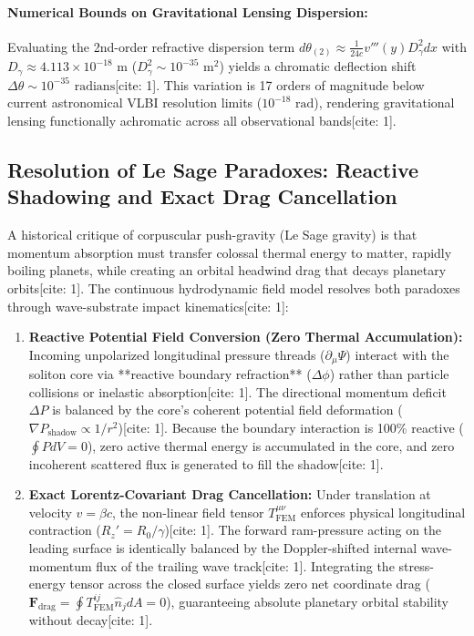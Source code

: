\documentclass[11pt,a4paper]{article}
\begin{document}
	\paragraph{Numerical Bounds on Gravitational Lensing Dispersion:}
	Evaluating the 2nd-order refractive dispersion term $d\theta_{(2)} \approx \frac{1}{24c} v'''(y) D_\gamma^2 dx$ with $D_\gamma \approx 4.113 \times 10^{-18}\text{ m}$ ($D_\gamma^2 \sim 10^{-35}\text{ m}^2$) yields a chromatic deflection shift $\Delta\theta \sim 10^{-35}\text{ radians}$[cite: 1]. This variation is 17 orders of magnitude below current astronomical VLBI resolution limits ($10^{-18}\text{ rad}$), rendering gravitational lensing functionally achromatic across all observational bands[cite: 1].
	
	\subsection{Resolution of Le Sage Paradoxes: Reactive Shadowing and Exact Drag Cancellation}
	A historical critique of corpuscular push-gravity (Le Sage gravity) is that momentum absorption must transfer colossal thermal energy to matter, rapidly boiling planets, while creating an orbital headwind drag that decays planetary orbits[cite: 1]. The continuous hydrodynamic field model resolves both paradoxes through wave-substrate impact kinematics[cite: 1]:
	\begin{enumerate}
		\item \textbf{Reactive Potential Field Conversion (Zero Thermal Accumulation):} Incoming unpolarized longitudinal pressure threads ($\partial_\mu \Psi$) interact with the soliton core via **reactive boundary refraction** ($\Delta\phi$) rather than particle collisions or inelastic absorption[cite: 1]. The directional momentum deficit $\Delta P$ is balanced by the core's coherent potential field deformation ($\nabla P_{\text{shadow}} \propto 1/r^2$)[cite: 1]. Because the boundary interaction is 100\% reactive ($\oint P dV = 0$), zero active thermal energy is accumulated in the core, and zero incoherent scattered flux is generated to fill the shadow[cite: 1].
		\item \textbf{Exact Lorentz-Covariant Drag Cancellation:} Under translation at velocity $v = \beta c$, the non-linear field tensor $T^{\mu\nu}_{\text{FEM}}$ enforces physical longitudinal contraction ($R_z' = R_0/\gamma$)[cite: 1]. The forward ram-pressure acting on the leading surface is identically balanced by the Doppler-shifted internal wave-momentum flux of the trailing wave track[cite: 1]. Integrating the stress-energy tensor across the closed surface yields zero net coordinate drag ($\mathbf{F}_{\text{drag}} = \oint T^{ij}_{\text{FEM}} \hat{n}_j dA = 0$), guaranteeing absolute planetary orbital stability without decay[cite: 1].
	\end{enumerate}
	
\end{document}

